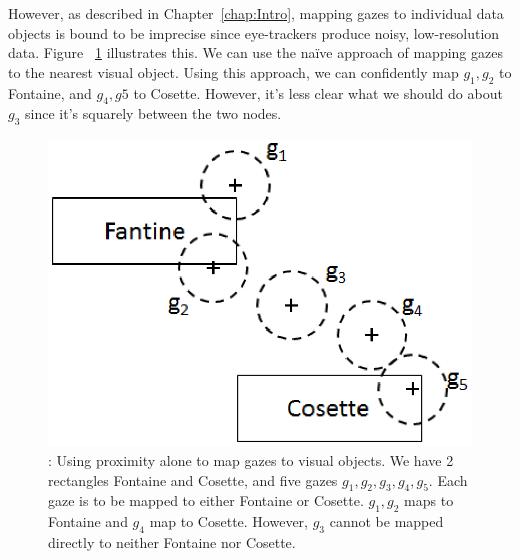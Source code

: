 However, as described in Chapter~\ref{chap:Intro}, mapping gazes to individual data objects is bound to be imprecise since eye-trackers produce noisy, low-resolution data. Figure ~\ref{fig:MiserablesGaze} illustrates this. We can use the na\"{i}ve approach of mapping gazes to the nearest visual object. Using this approach, we can confidently map $g_1, g_2$ to Fontaine, and $g_4, g5$ to Cosette. However, it's less clear what we should do about $g_3$ since it's squarely between the two nodes. 

\begin{figure}[htb]
  \centering
  \includegraphics[width=0.5\linewidth]{images/MiserablesGaze.eps}
  \caption{: Using proximity alone to map gazes to visual objects. We have 2 rectangles Fontaine and Cosette, and five gazes $g_1, g_2, g_3, g_4, g_5$. Each gaze is to be mapped to either Fontaine or Cosette. $g_1, g_2$ maps to Fontaine and $g_4$ map to Cosette. However, $g_3$ cannot be mapped directly to neither Fontaine nor Cosette. }
    \label{fig:MiserablesGaze}
\end{figure}